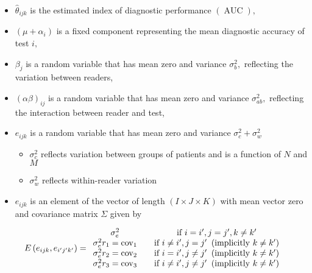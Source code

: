 \documentclass{article}%
\begin{document}
\begin{itemize}
\item $\widehat{\theta}_{ijk}$ is the estimated index of diagnostic
performance $\left(  \operatorname{AUC}\right)  ,$

\item $\left(  \mu+\alpha_{i}\right)  $ is a fixed component representing the
mean diagnostic accuracy of test $i,$

\item $\beta_{j}$ is a random variable that has mean zero and variance
$\sigma_{b}^{2},$ reflecting the variation between readers,

\item $\left(  \alpha\beta\right)  _{ij}$ is a random variable that has mean
zero and variance $\sigma_{ab}^{2},$ reflecting the interaction between reader
and test,

\item $e_{ijk}$ is a random variable that has mean zero and variance
$\sigma_{c}^{2}+\sigma_{w}^{2}$

\begin{itemize}
\item $\sigma_{c}^{2}$ reflects variation between groups of patients and is a
function of $N$ and $M$

\item $\sigma_{w}^{2}$ reflects within-reader variation
\end{itemize}

\item $e_{ijk}$ is an element of the vector of length $\left(  I\times J\times
K\right)  $ with mean vector zero and covariance matrix $\Sigma$ given by
\end{itemize}

%

\begin{equation}
E\left(  e_{ijk},e_{i^{\prime}j^{\prime}k^{\prime}}\right)  =%
\begin{array}
[c]{ccc}%
\sigma_{e}^{2} &  & \text{if }i=i^{\prime},j=j^{\prime},k\neq k^{\prime}\\
\sigma_{e}^{2}r_{1}=\operatorname{cov}_{1} &  & \text{if }i\neq i^{\prime
},j=j^{\prime}~\left(  \text{implicitly }k\neq k^{\prime}\right) \\
\sigma_{e}^{2}r_{2}=\operatorname{cov}_{2} &  & \text{if }i=i^{\prime},j\neq
j^{\prime}~\left(  \text{implicitly }k\neq k^{\prime}\right) \\
\sigma_{e}^{2}r_{3}=\operatorname{cov}_{3} &  & \text{if }i\neq i^{\prime
},j\neq j^{\prime}~\left(  \text{implicitly }k\neq k^{\prime}\right)
\end{array}
\end{equation}
\end{document}
